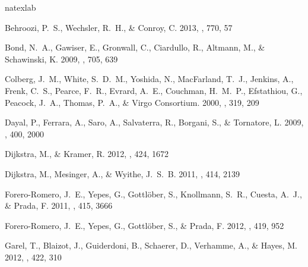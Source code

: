 \documentclass{emulateapj}
\begin{document}

%
\begin{thebibliography}{36}
\expandafter\ifx\csname natexlab\endcsname\relax\def\natexlab#1{#1}\fi

{Behroozi}, P.~S., {Wechsler}, R.~H., \& {Conroy}, C. 2013, \apj, 770, 57

{Bond}, N.~A., {Gawiser}, E., {Gronwall}, C., {Ciardullo}, R., {Altmann}, M.,
  \& {Schawinski}, K. 2009, \apj, 705, 639

{Colberg}, J.~M., {White}, S.~D.~M., {Yoshida}, N., {MacFarland}, T.~J.,
  {Jenkins}, A., {Frenk}, C.~S., {Pearce}, F.~R., {Evrard}, A.~E., {Couchman},
  H.~M.~P., {Efstathiou}, G., {Peacock}, J.~A., {Thomas}, P.~A., \& {Virgo
  Consortium}. 2000, \mnras, 319, 209

{Dayal}, P., {Ferrara}, A., {Saro}, A., {Salvaterra}, R., {Borgani}, S., \&
  {Tornatore}, L. 2009, \mnras, 400, 2000

{Dijkstra}, M., \& {Kramer}, R. 2012, \mnras, 424, 1672

{Dijkstra}, M., {Mesinger}, A., \& {Wyithe}, J.~S.~B. 2011, \mnras, 414, 2139

{Forero-Romero}, J.~E., {Yepes}, G., {Gottl{\"o}ber}, S., {Knollmann}, S.~R.,
  {Cuesta}, A.~J., \& {Prada}, F. 2011, \mnras, 415, 3666

{Forero-Romero}, J.~E., {Yepes}, G., {Gottl{\"o}ber}, S., \& {Prada}, F. 2012,
  \mnras, 419, 952

{Garel}, T., {Blaizot}, J., {Guiderdoni}, B., {Schaerer}, D., {Verhamme}, A.,
  \& {Hayes}, M. 2012, \mnras, 422, 310


\end{thebibliography}
\end{document}

